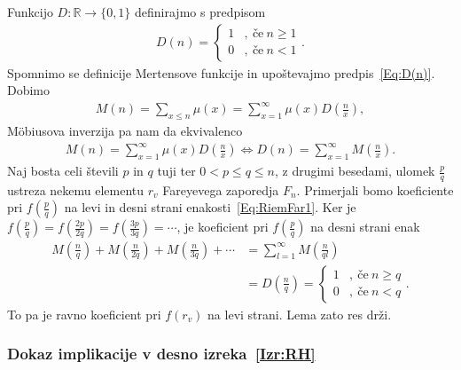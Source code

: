 \documentclass[mat1]{fmfdelo}
\begin{document}
\begin{dokaz}
Funkcijo $D: \mathbb{R} \to \{0,1\}$ definirajmo s predpisom
\begin{align}
\label{Eq:D(n)}
D(n) = \left\{
\begin{array}{rl}
	1 &,\ \textrm{če}\ n \geq 1 \\
	0 &,\ \textrm{če}\ n < 1
\end{array}.
\right.
\end{align}
Spomnimo se definicije Mertensove funkcije in upoštevajmo predpis~\eqref{Eq:D(n)}. Dobimo
\begin{align*}
M(n) = \sum_{x \leq n} \mu(x) = \sum_{x=1}^{\infty} \mu(x) D \left( \frac{n}{x} \right),
\end{align*}
M\"obiusova inverzija pa nam da ekvivalenco
\begin{align*}
M(n) = \sum_{x=1}^{\infty} \mu(x) D \left( \frac{n}{x} \right) \Longleftrightarrow
D(n) = \sum_{x=1}^{\infty} M \left( \frac{n}{x} \right).
\end{align*}
Naj bosta celi števili $p$ in $q$ tuji ter $0 < p \leq q \leq n$, z drugimi besedami, ulomek $\frac{p}{q}$ ustreza nekemu elementu $r_{v}$ Fareyevega zaporedja $F_{n}$.
Primerjali bomo koeficiente pri $f(\frac{p}{q})$ na levi in desni strani enakosti~\eqref{Eq:RiemFar1}.
Ker je $ f(\frac{p}{q}) = f(\frac{2p}{2q}) = f(\frac{3p}{3q}) = \cdots $, je koeficient pri $f(\frac{p}{q})$ na desni strani enak 
%
\begin{align*}
M \left(\frac{n}{q} \right) + M \left(\frac{n}{2q} \right) + M \left(\frac{n}{3q} \right) + \cdots &= \sum_{l=1}^{\infty} M \left(\frac{n}{ql} \right) \\
&= D \left(\frac{n}{q} \right) = \left\{
\begin{array}{rl}
	1 &,\ \textrm{če}\ n \geq q \\
	0 &,\ \textrm{če}\ n < q
\end{array}.
\right.
\end{align*}
%
To pa je ravno koeficient pri $f(r_{v})$ na levi strani. Lema zato res drži.
%
\end{dokaz}

\subsubsection{Dokaz implikacije v desno izreka~\ref{Izr:RH}}
\end{document}

